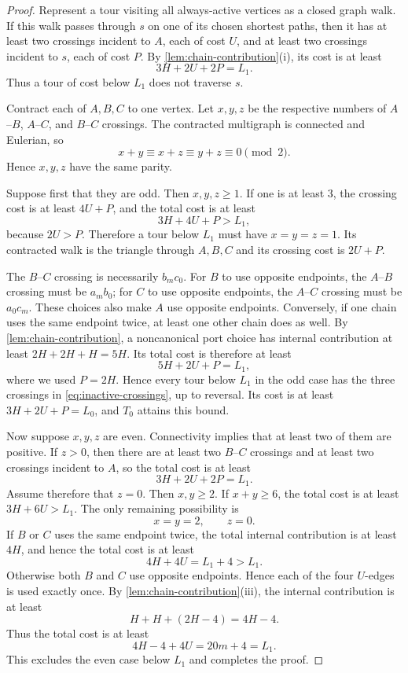 \documentclass[12pt,a4paper,oneside]{report}
\begin{document}
\begin{proof}
Represent a tour visiting all always-active vertices as a closed graph walk.
If this walk passes through $s$ on one of its chosen shortest paths, then it
has at least two crossings incident to $A$, each of cost $U$, and at least
two crossings incident to $s$, each of cost $P$.  By
\cref{lem:chain-contribution}(i), its cost is at least
\[
  3H+2U+2P=L_1.
\]
Thus a tour of cost below $L_1$ does not traverse $s$.

Contract each of $A,B,C$ to one vertex.  Let $x,y,z$ be the respective numbers
of $A$--$B$, $A$--$C$, and $B$--$C$ crossings.  The contracted multigraph is
connected and Eulerian, so
\[
  x+y\equiv x+z\equiv y+z\equiv0\pmod2.
\]
Hence $x,y,z$ have the same parity.

Suppose first that they are odd.  Then $x,y,z\ge1$.  If one is at least $3$,
the crossing cost is at least $4U+P$, and the total cost is at least
\[
  3H+4U+P>L_1,
\]
because $2U>P$.  Therefore a tour below $L_1$ must have
$x=y=z=1$.  Its contracted walk is the triangle through $A,B,C$ and its
crossing cost is $2U+P$.

The $B$--$C$ crossing is necessarily $b_mc_0$.  For $B$ to use opposite
endpoints, the $A$--$B$ crossing must be $a_mb_0$; for $C$ to use opposite
endpoints, the $A$--$C$ crossing must be $a_0c_m$.  These choices also make
$A$ use opposite endpoints.  Conversely, if one chain uses the same endpoint
twice, at least one other chain does as well.  By
\cref{lem:chain-contribution}, a noncanonical port choice has internal
contribution at least $2H+2H+H=5H$.  Its total cost is therefore at least
\[
  5H+2U+P=L_1,
\]
where we used $P=2H$.  Hence every tour below $L_1$ in the odd case has the
three crossings in \cref{eq:inactive-crossings}, up to reversal.  Its cost is
at least $3H+2U+P=L_0$, and $T_0$ attains this bound.

Now suppose $x,y,z$ are even.  Connectivity implies that at least two of them
are positive.  If $z>0$, then there are at least two $B$--$C$ crossings and at
least two crossings incident to $A$, so the total cost is at least
\[
  3H+2U+2P=L_1.
\]
Assume therefore that $z=0$.  Then $x,y\ge2$.  If $x+y\ge6$, the total cost is
at least $3H+6U>L_1$.  The only remaining possibility is
\[
  x=y=2,
  \qquad
  z=0.
\]
If $B$ or $C$ uses the same endpoint twice, the total internal contribution is
at least $4H$, and hence the total cost is at least
\[
  4H+4U=L_1+4>L_1.
\]
Otherwise both $B$ and $C$ use opposite endpoints.  Hence each of the four
$U$-edges is used exactly once.  By
\cref{lem:chain-contribution}(iii), the internal contribution is at least
\[
  H+H+(2H-4)=4H-4.
\]
Thus the total cost is at least
\[
  4H-4+4U
  =20m+4
  =L_1.
\]
This excludes the even case below $L_1$ and completes the proof.
\end{proof}
\end{document}
